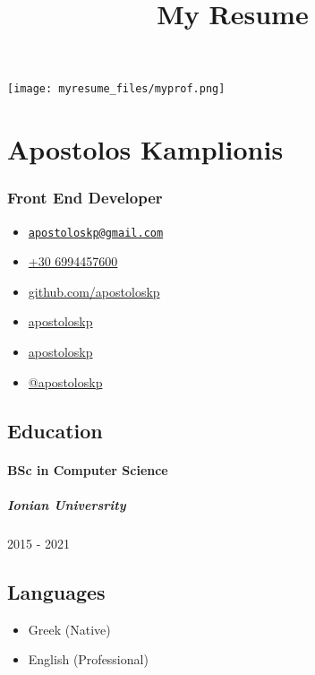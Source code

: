 \documentclass[]{article}
\title{My Resume}
\date{}
\providecommand{\tightlist}{%
  \setlength{\itemsep}{0pt}\setlength{\parskip}{0pt}}
\let\oldparagraph\paragraph
\renewcommand{\paragraph}[1]{\oldparagraph{#1}\mbox{}}
\let\oldsubparagraph\subparagraph
\renewcommand{\subparagraph}[1]{\oldsubparagraph{#1}\mbox{}}
\begin{document}
\maketitle

\texttt{[image: myresume\_files/myprof.png]}

\section{Apostolos Kamplionis}\label{apostolos-kamplionis}

\subsubsection{Front End Developer}\label{front-end-developer}

\begin{itemize}
\tightlist
\item
  \emph{}
  \href{mailto:apostoloskp@gmail.com}{\nolinkurl{apostoloskp@gmail.com}}
\item
  \emph{} \href{tel:+30\%206994457600}{+30 6994457600}
\item
  \emph{} \href{http://github.com/apostoloskp}{github.com/apostoloskp}
\item
  \emph{} \href{https://linkedin.com/in/apostoloskp}{apostoloskp}
\item
  \emph{} \href{http://github.com/apostoloskp}{apostoloskp}
\item
  \emph{} \href{https://twitter.com/@apostoloskp}{@apostoloskp}
\end{itemize}

\subsection{Education}\label{education}

\paragraph{BSc in Computer Science}\label{bsc-in-computer-science}

\subparagraph{Ionian Universrity}\label{ionian-universrity}

2015 - 2021

\subsection{Languages}\label{languages}

\begin{itemize}
\tightlist
\item
  Greek {(Native)}
\item
  English {(Professional)}
\end{itemize}
\end{document}
